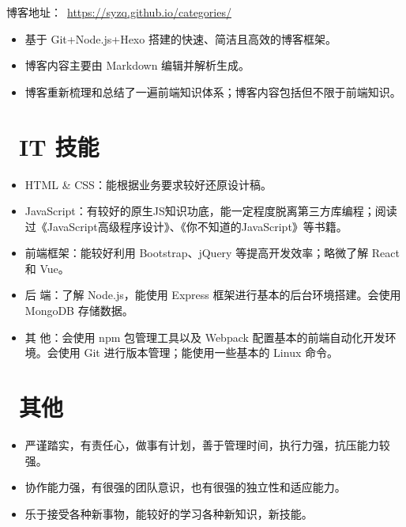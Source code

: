 \documentclass{resume}
\begin{document}
\begin{onehalfspacing}
博客地址：\faLink \ \href{https://syzq.github.io/categories/}{https://syzq.github.io/categories/}
\begin{itemize}
  \item 基于 Git+Node.js+Hexo 搭建的快速、简洁且高效的博客框架。
  \item 博客内容主要由 Markdown 编辑并解析生成。
  \item 博客重新梳理和总结了一遍前端知识体系；博客内容包括但不限于前端知识。
\end{itemize}
\end{onehalfspacing}


\section{\faCog\ IT 技能}
\begin{itemize}[parsep=0.5ex]
  \item HTML \& CSS：能根据业务要求较好还原设计稿。
  \item JavaScript：有较好的原生JS知识功底，能一定程度脱离第三方库编程；阅读过《JavaScript高级程序设计》、《你不知道的JavaScript》等书籍。
  \item 前端框架：能较好利用 Bootstrap、jQuery 等提高开发效率；略微了解 React和 Vue。
  \item 后    端：了解 Node.js，能使用 Express 框架进行基本的后台环境搭建。会使用 MongoDB 存储数据。
  \item 其    他：会使用 npm 包管理工具以及 Webpack 配置基本的前端自动化开发环境。会使用 Git 进行版本管理；能使用一些基本的 Linux 命令。
\end{itemize}


\section{\faInfoCircle\ 其他}
\begin{itemize}[parsep=0.5ex]
  \item 严谨踏实，有责任心，做事有计划，善于管理时间，执行力强，抗压能力较强。
  \item 协作能力强，有很强的团队意识，也有很强的独立性和适应能力。
  \item 乐于接受各种新事物，能较好的学习各种新知识，新技能。
\end{itemize}

%
%
\end{document}
